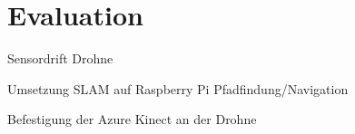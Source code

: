 \chapter{Evaluation}


Sensordrift Drohne

Umsetzung SLAM auf Raspberry Pi
Pfadfindung/Navigation

Befestigung der Azure Kinect an der Drohne








